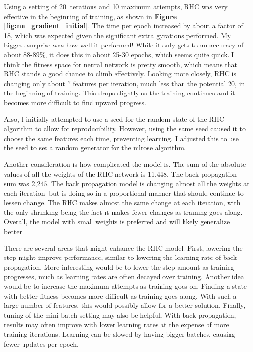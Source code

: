 \documentclass[letterpaper]{article} %
\begin{document}
Using a setting of 20 iterations and 10 maximum attempts, RHC was very effective in the beginning of training, as shown in \textbf{Figure \ref{fig:nn_gradient_initial}}.  The time per epoch increased by about a factor of 18, which was expected given the significant extra gyrations performed.  My biggest surprise was how well it performed!  While it only gets to an accuracy of about 88-89\%, it does this in about 25-30 epochs, which seems quite quick.  I think the fitness space for neural network is pretty smooth, which means that RHC stands a good chance to climb effectively.  Looking more closely, RHC is changing only about 7 features per iteration, much less than the potential 20, in the beginning of training.  This drops slightly as the training continues and it becomes more difficult to find upward progress.  

Also, I initially attempted to use a seed for the random state of the RHC algorithm to allow for reproducibility.  However, using the same seed caused it to choose the same features each time, preventing learning.  I adjusted this to use the seed to set a random generator for the mlrose algorithm.

Another consideration is how complicated the model is.   The sum of the absolute values of all the weights of the RHC network is 11,448.  The back propagation sum was 2,245.  The back propagation model is changing almost all the weights at each iteration, but is doing so in a proportional manner that should continue to lessen change.  The RHC makes almost the same change at each iteration, with the only shrinking being the fact it makes fewer changes as training goes along.  Overall, the model with small weights is preferred and will likely generalize better. 

There are several areas that might enhance the RHC model. First, lowering the step might improve performance, similar to lowering the learning rate of back propagation.  More interesting would be to lower the step amount as training progresses,  much as learning rates are often decayed over training.  Another idea would be to increase the maximum attempts as training goes on.  Finding a state with better fitness becomes more difficult as training goes along. With such a large number of features,  this would possibly allow for a better solution.  Finally, tuning of the mini batch setting may also be helpful.  With back propagation, results may often improve with lower learning rates at the expense of more training iterations.  Learning can be slowed by having bigger batches, causing fewer updates per epoch.  
\end{document}
